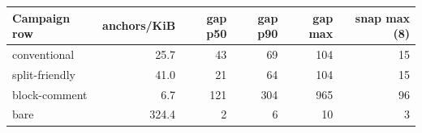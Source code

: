 \begin{tabular}{@{}lrrrrr@{}}
\toprule
Campaign row & anchors/KiB & gap p50 & gap p90 & gap max & snap max (8) \\
\midrule
conventional & 25.7 & 43 & 69 & 104 & 15 \\
split-friendly & 41.0 & 21 & 64 & 104 & 15 \\
block-comment & 6.7 & 121 & 304 & 965 & 96 \\
bare & 324.4 & 2 & 6 & 10 & 3 \\
\bottomrule
\end{tabular}
